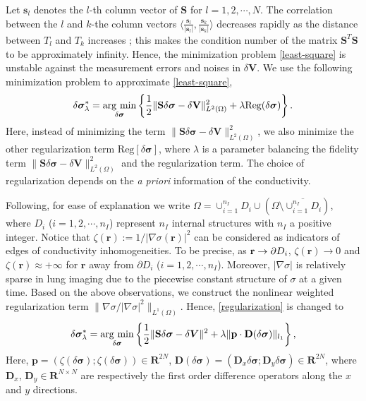 \documentclass[lettersize,journal]{IEEEtran}
\def\r{\mathbf{r}}
\begin{document}
Let $\mathbf{s}_l$ denotes the $l$-th column vector of $\mathbf{S}$ for $l=1,2,\cdots,N$. The correlation between the $l$ and $k$-the column vectors $\langle \frac{\mathbf{s}_l}{|\mathbf{s}_l|}, \frac{\mathbf{s}_k}{|\mathbf{s}_k|}\rangle$ decreases rapidly as the distance between $T_l$ and $T_k$ increases \cite{Lee2018}; this makes the condition number of the matrix $\mathbf{S}^T \mathbf{S}$ to be approximately infinity. Hence, the minimization problem \eqref{least-square} is unstable against the measurement errors and noises in $\delta \mathbf{V}$.
We use the following minimization problem to approximate \eqref{least-square},
\begin{equation}\label{regularization}
  \delta\bm{\sigma}^*_{\lambda} = \mathop{{\rm arg\ min}}\limits_
{\delta\bm{\sigma}}\left\{\frac{1}{2}\|\mathbf{S}\delta\bm{\sigma} - \delta\mathbf{V} \|^2_{L^2(\Omega)}+ \lambda\mbox{Reg}(\delta\bm{\sigma})\right\}.
\end{equation}
Here, instead of minimizing the term $\|\mathbf{S}\delta\bm{\sigma} - \delta\mathbf{V} \|^2_{L^2(\Omega)}$, we also minimize the other regularization term $\mbox{Reg}[\delta{\bm{\sigma}}]$, where $\lambda$ is a parameter balancing the fidelity term $\|\mathbf{S}\delta\bm{\sigma} - \delta\mathbf{V} \|^2_{L^2(\Omega)}$ and the regularization term. The choice of regularization depends on the {\it a priori} information of the conductivity.

Following, for ease of explanation we write $\Omega = \cup_{i=1}^{n_I} D_i \cup (\Omega\setminus \overline{\cup_{i=1}^{n_I} D_i})$, where $D_i$ ($i=1,2,\cdots,n_I$) represent $n_I$ internal structures with $n_I$ a positive integer.
Notice that $\zeta(\r) := 1/|\nabla \sigma(\r)|^2$ can be considered as indicators of edges of conductivity inhomogeneities. To be precise, as ${\bf r}\to \partial D_i$, $\zeta(\r)\to 0$ and $\zeta(\r)\approx +\infty$ for $\r$ away from $\partial D_i$ ($i=1,2,\cdots,n_I$).
 Moreover, $|\nabla \sigma|$ is relatively sparse in lung imaging due to the piecewise constant structure of $\sigma$ at a given time.
Based on the above observations, we construct the nonlinear weighted regularization term $\|\nabla\sigma/|\nabla\sigma|^2\|_{L^1(\Omega)}$. Hence, \eqref{regularization} is changed to
\begin{equation}\label{proposed method}
 \delta\bm{\sigma}^{*}_{\lambda}=\mathop{{\rm arg\ min}}\limits_{\delta\bm{\sigma}}  \left\{\frac{1}{2}\|\mathbf{S}\delta\bm{\sigma}-\delta\bm{V}\|^{2}+\lambda\|\mathbf{p}\cdot\mathbf{D}(\delta\bm{\sigma})\|_{l_1}\right\},
\end{equation}
Here, $\mathbf{p}=(\zeta(\delta\bm{\sigma});\zeta(\delta\bm{\sigma}))\in \mathbf{R}^{2N}$, $\mathbf{D}(\delta\bm{\sigma}) = (\mathbf{D}_{x}{\delta\bm{\sigma}};\mathbf{D}_{y}{\delta\bm{\sigma}})\in \mathbf{R}^{2N}$,
where $\mathbf{D}_{x}$, $\mathbf{D}_{y} \in \mathbf{R}^{N\times N}$ are respectively the first order difference operators along the $x$ and $y$ directions.
\end{document}
